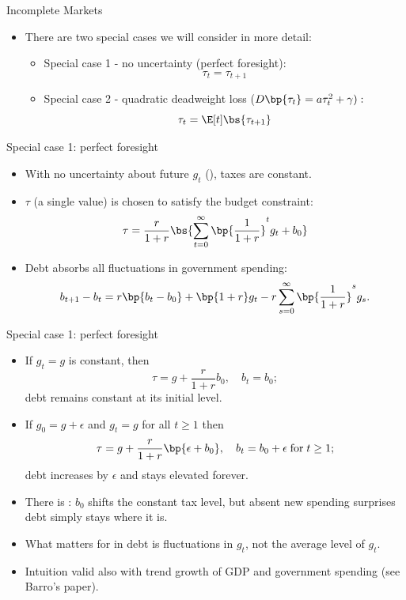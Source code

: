 \documentclass[11pt,xcolor={dvipsnames},aspectratio=159,hyperref={pdftex,pdfpagemode=UseNone,hidelinks,pdfdisplaydoctitle=true},usepdftitle=false]{beamer}
\begin{document}
    \begin{frame}{Incomplete Markets}
        \begin{itemize}
        \item  There are two special cases we will consider in more detail:
        \begin{itemize}
            \item Special case 1 - no uncertainty (perfect foresight):    
                 $$\tau_{t}=\tau_{t+1}$$
            \item Special case 2 - quadratic deadweight loss ($D\bp{\tau_{t}}=a\tau_{t}^{2}+\gamma):$
                $$\tau_{t}=\E[t]\bs{\tau_{t+1}}$$
        \end{itemize}
        \end{itemize}
        
        \end{frame}

    \begin{frame}{Special case 1: perfect foresight}
        \begin{itemize} 
            \item With no uncertainty about future $g_t$ (), taxes are constant.
            \item $\tau$ (a single value) is chosen to satisfy the budget constraint: \[ \tau = \frac{r}{1+r} \bs{\sum_{t=0}^{\infty}\bp{\frac{1}{1+r}}^t g_t + b_0} \]
            \item Debt absorbs all fluctuations in government spending:
            \[ b_{t+1} - b_{t} = r \bp{b_t - b_0} +  \bp{1+r}g_t - r \sum_{s=0}^{\infty}\bp{\frac{1}{1+r}}^s g_s. \]
        \end{itemize}
            
    
    \end{frame}
    
    \begin{frame}{Special case 1: perfect foresight}
        \begin{itemize} 
            \item If $g_t=g$ is constant, then \vspace{-2pt}
            \[ \tau = g + \frac{r}{1+r}b_0, \quad b_t = b_0; \] debt remains constant at its initial level. 
            \item If $g_0 = g + \epsilon$ and $g_t = g$ for all $t\geq1$ then  \vspace{-2pt}\[\tau=g+\frac{r}{1+r}\bp{\epsilon+b_0}, \quad b_t = b_0 + \epsilon \;\text{for}\; t \geq 1;\] debt increases by $\epsilon$ and stays elevated forever.
        \item There is : $b_0$ shifts the constant tax level, but absent new spending surprises debt simply stays where it is.
        \item What matters for  in debt is  fluctuations in $g_t$, not the average level of $g_t$.
        \item Intuition valid also with trend growth of GDP and government spending (see Barro's paper). 
            \end{itemize}
            
    
    \end{frame}
\end{document}
